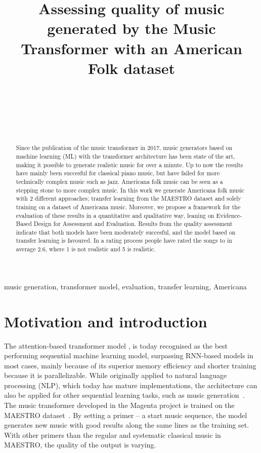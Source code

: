 \documentclass{IEEEtran}
\title{Assessing quality of music generated by the Music Transformer with an
American Folk dataset \\
}
\author{
    \IEEEauthorblockN{Sebastian G. Winther-Larsen} \\
    \IEEEauthorblockA{\textit{Center for Computing in Science Education,
        Department of Physics, University of Oslo} \\
    }
    \and
    \IEEEauthorblockN{Tom F. Hansen} \\
    \IEEEauthorblockA{\textit{Institute of Informatics, University of Oslo} \\ }
    \and
    \IEEEauthorblockN{Bjørn Iversen} \\
    \IEEEauthorblockA{\textit{Institute of Informatics, University of Oslo} \\ }
}
\begin{document}
\maketitle

\begin{abstract}
    Since the publication of the music transformer in 2017,
    music generators based on machine learning (ML) with the transformer architecture 
    has been state of the
    art, making it possible to generate realistic music for over a minute. Up to now
    the results have mainly been succesful for classical piano music, but have failed for
    more technically complex music such as jazz. Americana folk music can be seen
    as a stepping stone to more complex music. In this work we generate Americana
    folk music with 2 different approaches; transfer learning from the MAESTRO
    dataset and solely training on a dataset of Americana music.
    Moreover, we propose
    a framework for the evaluation of these results in a quantitative and
    qualitative way, leaning on Evidence-Based Design 
    for Assessment and Evaluation. Results from the quality
    assessment indicate that both models have been moderately succesful, and the
    model based on transfer learning is favoured. In a rating process people have
    rated the songs to in average 2.6, where 1 is not realistic and 5 is
    realistic.
\end{abstract}

\begin{IEEEkeywords}
    music generation, transformer model, evaluation,
    transfer learning, Americana
\end{IEEEkeywords}

\section{Motivation and introduction}

The attention-based transformer model \cite{vaswani2017attention}, is today
recognised as the best performing sequential machine learning model,
surpassing RNN-based models in most cases, mainly because of its
superior memory efficiency and shorter training because it is parallelizable.
While originally applied to natural language processing (NLP),
which today has mature implementations,
the architecture can also be applied for other sequential learning tasks,
such as music generation~\cite{huang2018music}. The music transformer
developed in the Magenta project is trained on the MAESTRO
dataset~\cite{maestrodataset}. By setting a primer – a start music sequence,
the model generates new music with good results along the same lines as the
training set. With other primers than the regular and systematic classical
music in MAESTRO, the quality of the output is varying.
\end{document}
